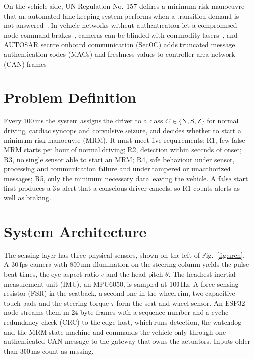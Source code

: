 \documentclass[conference]{IEEEtran}
\begin{document}
On the vehicle side, UN Regulation No.~157 defines a minimum risk manoeuvre that an automated lane keeping system performs when a transition demand is not answered~\cite{unece157}. In-vehicle networks without authentication let a compromised node command brakes~\cite{koscher2010}, cameras can be blinded with commodity lasers~\cite{petit2015}, and AUTOSAR secure onboard communication (SecOC) adds truncated message authentication codes (MACs) and freshness values to controller area network (CAN) frames~\cite{autosar_secoc}.

\section{Problem Definition}
Every 100\,ms the system assigns the driver to a class $C\in\{\mathrm{N},\mathrm{S},\mathrm{Z}\}$ for normal driving, cardiac syncope and convulsive seizure, and decides whether to start a minimum risk manoeuvre (MRM). It must meet five requirements: R1, few false MRM starts per hour of normal driving; R2, detection within seconds of onset; R3, no single sensor able to start an MRM; R4, safe behaviour under sensor, processing and communication failure and under tampered or unauthorized messages; R5, only the minimum necessary data leaving the vehicle. A false start first produces a 3\,s alert that a conscious driver cancels, so R1 counts alerts as well as braking.

\section{System Architecture}
The sensing layer has three physical sensors, shown on the left of Fig.~\ref{fig:arch}. A 30\,fps camera with 850\,nm illumination on the steering column yields the pulse beat times, the eye aspect ratio $e$ and the head pitch $\theta$. The headrest inertial measurement unit (IMU), an MPU6050, is sampled at 100\,Hz. A force-sensing resistor (FSR) in the seatback, a second one in the wheel rim, two capacitive touch pads and the steering torque $\tau$ form the seat and wheel sensor. An ESP32 node streams them in 24-byte frames with a sequence number and a cyclic redundancy check (CRC) to the edge host, which runs detection, the watchdog and the MRM state machine and commands the vehicle only through one authenticated CAN message to the gateway that owns the actuators. Inputs older than 300\,ms count as missing.
\end{document}
